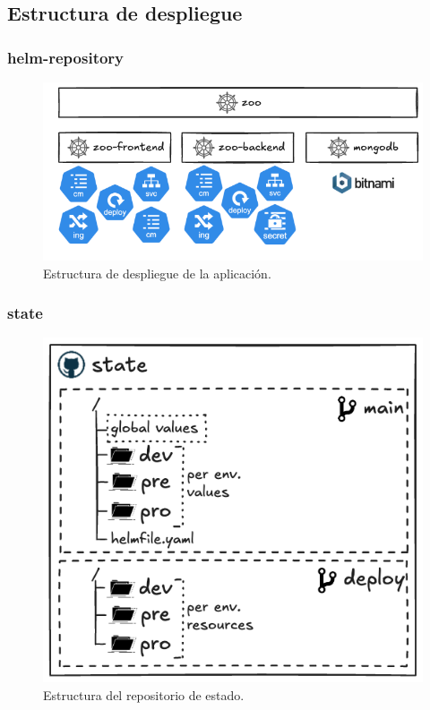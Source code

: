 \documentclass{beamer}
\begin{document}
\subsection{Estructura de despliegue}
\begin{frame}
    \frametitle{helm-repository}
    \begin{figure}
        \includegraphics[scale=0.4]{figuras/helm-repository}
        \caption{Estructura de despliegue de la aplicación.}
    \end{figure}
\end{frame}

\begin{frame}
    \frametitle{state}
    \begin{figure}
        \includegraphics[scale=0.3]{figuras/state}
        \caption{Estructura del repositorio de estado.}
    \end{figure}
\end{frame}
\end{document}
